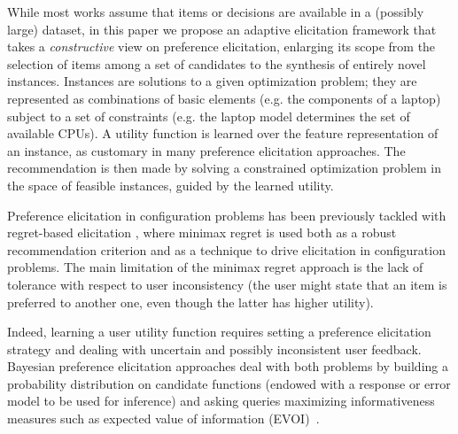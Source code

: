 \documentclass{article}
\renewcommand\[{\begin{equation}}
\renewcommand\]{\end{equation}}
\begin{document}


While most works assume that items or decisions are available in a (possibly large)
dataset, in this paper we propose an adaptive elicitation framework that takes a {\em constructive} view on preference
elicitation, enlarging its scope from the selection of items among a
set of candidates to the synthesis of entirely novel instances. 
Instances are solutions to a given optimization problem; they are represented as combinations of basic elements
(e.g. the components of a laptop) subject to a set of constraints
(e.g. the laptop model determines the set of available CPUs). 
A utility function is learned over the feature representation of an
instance, as customary in many preference elicitation approaches. 
The recommendation is then made by solving a constrained optimization
 problem in the space of feasible instances, guided by the learned
utility. 

Preference elicitation in configuration problems has been previously tackled with regret-based elicitation \cite{boutilier2006,braziunas2007}, where minimax regret is used both
as a robust recommendation criterion and as a technique to drive elicitation in configuration problems.
The main limitation of the minimax regret approach is the lack of tolerance with respect to user inconsistency (the user might state that an item is preferred to another one, even though the latter has higher utility).

Indeed, learning a user utility function requires setting a preference
elicitation strategy and dealing with uncertain and possibly
inconsistent user feedback. 
Bayesian preference elicitation approaches
deal with both problems by building a probability distribution on
candidate functions (endowed with a response or error model to be used for inference) and asking queries maximizing informativeness
measures such as expected value of information (EVOI)~\cite{chajewska2000,guo2010real,viappiani2010optimal}. 
\end{document}
